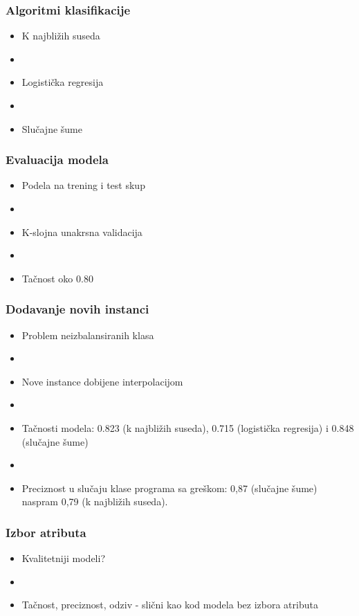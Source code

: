 \documentclass[14pt]{beamer}
\begin{document}
\begin{frame}
\frametitle{Algoritmi klasifikacije}

\begin{itemize}
\item K najbližih suseda
\item[]
\item Logistička regresija
\item[]
\item Slučajne šume
\end{itemize}

\end{frame}

\begin{frame}
\frametitle{Evaluacija modela}

\begin{itemize}
\item Podela na trening i test skup
\item[]
\item K-slojna unakrsna validacija
\item[]
\item Tačnost oko 0.80
\end{itemize}

\end{frame}

\begin{frame}
\frametitle{Dodavanje novih instanci}

\begin{itemize}
\item Problem neizbalansiranih klasa
\item[]
\item Nove instance dobijene interpolacijom
\item[]
\item Tačnosti modela: 0.823 (k najbližih suseda), 0.715 (logistička regresija) i 0.848 (slučajne šume)
\item[]
\item Preciznost u slučaju klase programa sa greškom: 0,87 (slučajne šume) naspram 0,79 (k najbližih suseda).
\end{itemize}

\end{frame}

\begin{frame}
\frametitle{Izbor atributa}

\begin{itemize}
\item Kvalitetniji modeli?
\item[]
\item Tačnost, preciznost, odziv - slični kao kod modela bez izbora atributa
\end{itemize}

\end{frame}
\end{document}
